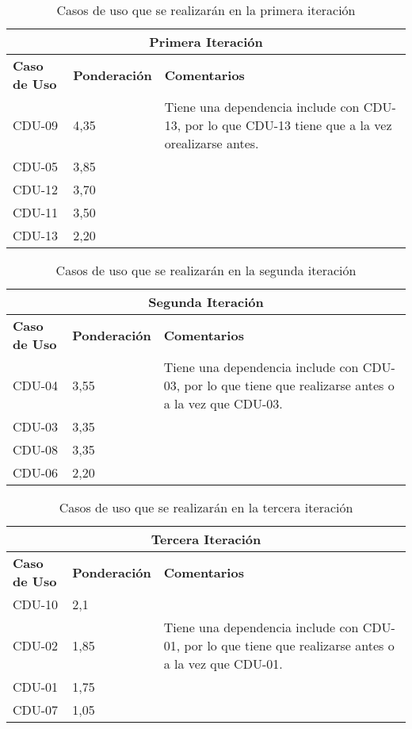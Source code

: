 \begin{table}[H]
\begin{center}
\begin{tabular}{p{2cm} p{2cm} p{8cm}}
  \multicolumn{3}{c}{\textbf{Primera Iteración} } \\ \hline \hline
  \textbf{Caso de Uso} & \textbf{Ponderación} & \textbf{Comentarios} \\ \hline \hline
  CDU-09 & 4,35 & Tiene una dependencia include con CDU-13, por lo que CDU-13 tiene que a la vez orealizarse antes. \\ \hline
  CDU-05 & 3,85 & \\ \hline
  CDU-12 & 3,70 & \\ \hline
  CDU-11 & 3,50 & \\ \hline
  CDU-13 & 2,20 & \\ \hline
\end{tabular}
\caption{Casos de uso que se realizarán en la primera iteración}
\label{tab:iteracion1}
\end{center}
\end{table}

\begin{table}[H]
\begin{center}
\begin{tabular}{p{2cm} p{2cm} p{8cm}}
  \multicolumn{3}{c}{\textbf{Segunda Iteración} } \\ \hline \hline
  \textbf{Caso de Uso} & \textbf{Ponderación} & \textbf{Comentarios} \\ \hline \hline
  CDU-04 & 3,55 & Tiene una dependencia include con CDU-03, por lo que tiene que realizarse antes o a la vez que CDU-03. \\ \hline
  CDU-03 & 3,35 & \\ \hline
  CDU-08 & 3,35 & \\ \hline
  CDU-06 & 2,20 & \\ \hline
\end{tabular}
\caption{Casos de uso que se realizarán en la segunda iteración}
\label{tab:iteracion2}
\end{center}
\end{table}

\begin{table}[H]
\begin{center}
\begin{tabular}{p{2cm} p{2cm} p{8cm}}
  \multicolumn{3}{c}{\textbf{Tercera Iteración} } \\ \hline \hline
  \textbf{Caso de Uso} & \textbf{Ponderación} & \textbf{Comentarios} \\ \hline \hline
  CDU-10 & 2,1 & \\ \hline
  CDU-02 & 1,85 & Tiene una dependencia include con CDU-01, por lo que tiene que realizarse antes o a la vez que CDU-01. \\ \hline
  CDU-01 & 1,75 & \\ \hline
  CDU-07 & 1,05 & \\ \hline
\end{tabular}
\caption{Casos de uso que se realizarán en la tercera iteración}
\label{tab:iteracion3}
\end{center}
\end{table}
